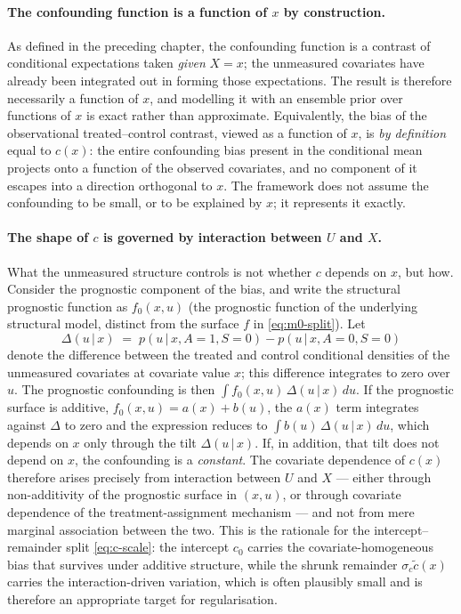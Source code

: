 \documentclass[11pt]{report}
\theoremstyle{plain}
\theoremstyle{definition}
\theoremstyle{remark}
\newcommand{\1}{\mathds{1}}
\theoremstyle{plain}
\theoremstyle{remark}
\newcommand{\given}{\,\vert\,}
\begin{document}
\paragraph{The confounding function is a function of $x$ by construction.}
As defined in the preceding chapter, the confounding function is a contrast of
conditional expectations taken \emph{given} $X = x$; the unmeasured covariates
have already been integrated out in forming those expectations. The result is
therefore necessarily a function of $x$, and modelling it with an ensemble prior
over functions of $x$ is exact rather than approximate. Equivalently, the bias
of the observational treated--control contrast, viewed as a function of $x$, is
\emph{by definition} equal to $c(x)$: the entire confounding bias present in the
conditional mean projects onto a function of the observed covariates, and no
component of it escapes into a direction orthogonal to $x$. The framework does
not assume the confounding to be small, or to be explained by $x$; it represents
it exactly.

\paragraph{The shape of $c$ is governed by interaction between $U$ and $X$.}
What the unmeasured structure controls is not whether $c$ depends on $x$, but
how. Consider the prognostic component of the bias, and write the structural
prognostic function as $f_0(x,u)$ (the prognostic function of the underlying
structural model, distinct from the surface $f$ in \eqref{eq:m0-split}). Let
\[
\Delta(u \given x) \;=\;
  p(u \given x, A{=}1, S{=}0) - p(u \given x, A{=}0, S{=}0)
\]
denote the difference between the treated and control conditional densities of
the unmeasured covariates at covariate value $x$; this difference integrates to
zero over $u$. The prognostic confounding is then
$\int f_0(x,u)\,\Delta(u \given x)\,du$. If the prognostic surface is additive,
$f_0(x,u) = a(x) + b(u)$, the $a(x)$ term integrates against $\Delta$ to zero
and the expression reduces to $\int b(u)\,\Delta(u \given x)\,du$, which depends
on $x$ only through the tilt $\Delta(u \given x)$. If, in addition, that tilt
does not depend on $x$, the confounding is a \emph{constant}. The covariate
dependence of $c(x)$ therefore arises precisely from interaction between $U$ and
$X$ --- either through non-additivity of the prognostic surface in $(x,u)$, or
through covariate dependence of the treatment-assignment mechanism --- and not
from mere marginal association between the two. This is the rationale for the
intercept--remainder split \eqref{eq:c-scale}: the intercept $c_0$ carries the
covariate-homogeneous bias that survives under additive structure, while the
shrunk remainder $\sigma_c \tilde c(x)$ carries the interaction-driven
variation, which is often plausibly small and is therefore an appropriate target
for regularisation.
\end{document}
